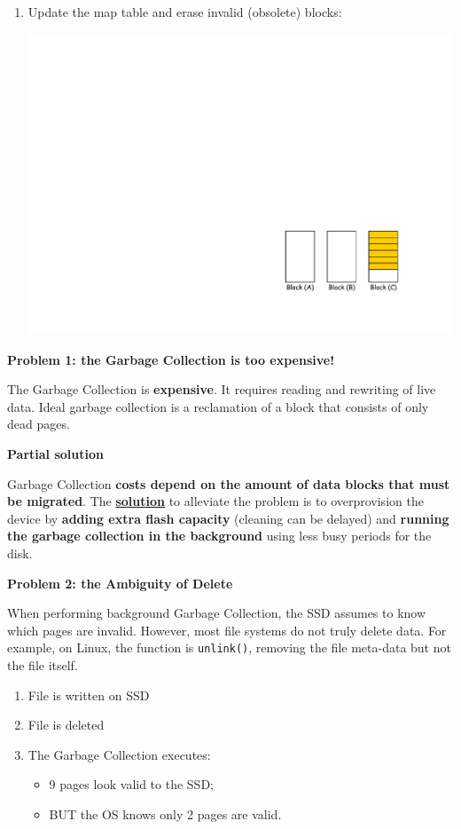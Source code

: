 \begin{examplebox}
\begin{enumerate}
        \item Update the map table and erase invalid (obsolete) blocks:
        \begin{center}
            \includegraphics[width=.5\textwidth]{img/garbage-collection-5.pdf}
        \end{center}
    \end{enumerate}
\end{examplebox}

\begin{flushleft}
    \textcolor{Red2}{ \textbf{Problem 1: the Garbage Collection is too expensive!}}
\end{flushleft}
The Garbage Collection is \textbf{expensive}. It requires reading and rewriting of live data. Ideal garbage collection is a reclamation of a block that consists of only dead pages.

\highspace
\begin{flushleft}
    \textcolor{Green3}{ \textbf{Partial solution}}
\end{flushleft}
Garbage Collection \textbf{costs depend on the amount of data blocks that must be migrated}. The \underline{\textbf{solution}} to alleviate the problem is to overprovision the device by \textbf{adding extra flash capacity} (cleaning can be delayed) and \textbf{running the garbage collection in the background} using less busy periods for the disk.

\highspace
\begin{flushleft}
    \textcolor{Red2}{ \textbf{Problem 2: the Ambiguity of Delete}}
\end{flushleft}
When performing background Garbage Collection, the SSD assumes to know which pages are invalid. However, most file systems do not truly delete data. For example, on Linux, the  function is \texttt{unlink()}, removing the file meta-data but not the file itself.
\begin{enumerate}
    \item File is written on SSD
    \item File is deleted
    \item The Garbage Collection executes:
    \begin{itemize}
        \item 9 pages look valid to the SSD;
        \item BUT the OS knows only 2 pages are valid.
    \end{itemize}
\end{enumerate}

